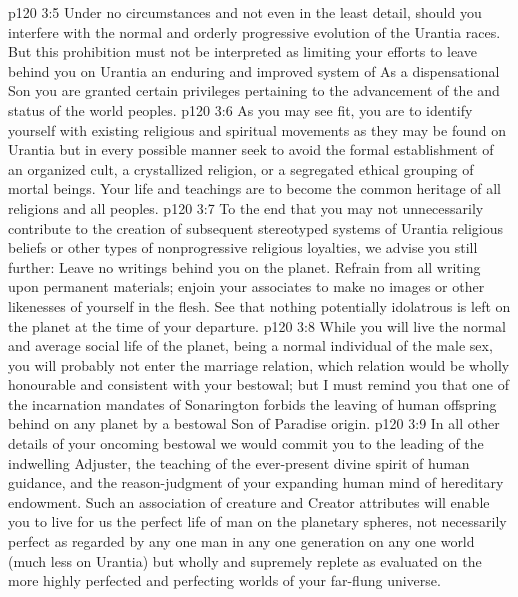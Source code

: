 \vs p120 3:5 \bibnobreakspace Under no circumstances and not even in the least detail, should you interfere with the normal and orderly progressive evolution of the Urantia races. But this prohibition must not be interpreted as limiting your efforts to leave behind you on Urantia an enduring and improved system of  As a dispensational Son you are granted certain privileges pertaining to the advancement of the  and  status of the world peoples.
\vs p120 3:6 \bibnobreakspace As you may see fit, you are to identify yourself with existing religious and spiritual movements as they may be found on Urantia but in every possible manner seek to avoid the formal establishment of an organized cult, a crystallized religion, or a segregated ethical grouping of mortal beings. Your life and teachings are to become the common heritage of all religions and all peoples.
\vs p120 3:7 \bibnobreakspace To the end that you may not unnecessarily contribute to the creation of subsequent stereotyped systems of Urantia religious beliefs or other types of nonprogressive religious loyalties, we advise you still further: Leave no writings behind you on the planet. Refrain from all writing upon permanent materials; enjoin your associates to make no images or other likenesses of yourself in the flesh. See that nothing potentially idolatrous is left on the planet at the time of your departure.
\vs p120 3:8 \bibnobreakspace While you will live the normal and average social life of the planet, being a normal individual of the male sex, you will probably not enter the marriage relation, which relation would be wholly honourable and consistent with your bestowal; but I must remind you that one of the incarnation mandates of Sonarington forbids the leaving of human offspring behind on any planet by a bestowal Son of Paradise origin.
\vs p120 3:9 \bibnobreakspace In all other details of your oncoming bestowal we would commit you to the leading of the indwelling Adjuster, the teaching of the ever\hyp{}present divine spirit of human guidance, and the reason\hyp{}judgment of your expanding human mind of hereditary endowment. Such an association of creature and Creator attributes will enable you to live for us the perfect life of man on the planetary spheres, not necessarily perfect as regarded by any one man in any one generation on any one world (much less on Urantia) but wholly and supremely replete as evaluated on the more highly perfected and perfecting worlds of your far\hyp{}flung universe.
